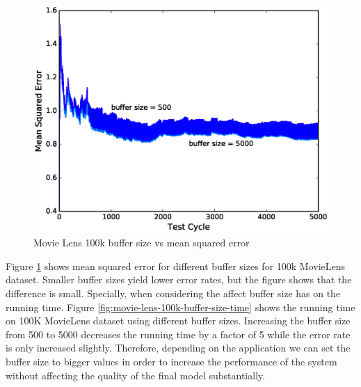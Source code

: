 \documentclass{sig-alternate-05-2015}
\begin{document}
\begin{figure}[H]
\centering
\includegraphics[width=\columnwidth]{../images/experiment-results/movie-lens-100k-buffer-size.eps}
\caption{Movie Lens 100k buffer size vs mean squared error}
\label{fig:movie-lens-100k-buffer-size-mse}
\end{figure}

Figure \ref{fig:movie-lens-100k-buffer-size-mse} shows mean squared error for different buffer sizes for 100k MovieLens dataset. 
Smaller buffer sizes yield lower error rates, but the figure shows that the difference is small.
Specially, when considering the affect buffer size has on the running time.
Figure \ref{fig:movie-lens-100k-buffer-size-time} shows the running time on 100K MovieLens dataset using different buffer sizes. 
Increasing the buffer size from 500 to 5000 decreases the running time by a factor of 5 while the error rate is only increased slightly.
Therefore, depending on the application we can set the buffer size to bigger values in order to increase the performance of the system without affecting the quality of the final model substantially.
\end{document}
